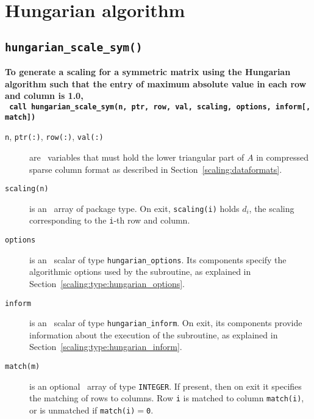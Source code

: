 
\section{Hungarian algorithm}

\subsection{\texttt{hungarian\_scale\_sym()}}

\textbf{\noindent
   To generate a scaling for a symmetric matrix using the Hungarian algorithm such that the entry of maximum absolute value in each row and column is 1.0,
   \vspace*{0.3cm} \\
   \texttt{ \hspace*{0.2cm}
      call hungarian\_scale\_sym(n, ptr, row, val, scaling, options, inform[, match])
   }
   \vspace{0.3cm}
}

\begin{description}

\item[\texttt{n}, \texttt{ptr(:)}, \texttt{row(:)}, \texttt{val(:)}] are \intentin\ variables that must hold the lower triangular part of $A$ in compressed sparse column format as described in Section~\ref{scaling:dataformats}.

\item[\texttt{scaling(n)}] is an \intentout\ array of package type. On exit,
\texttt{scaling(i)} holds $d_i$, the scaling corresponding to the
\texttt{i}-th row and column.

\item[\texttt{options}] is an \intentin\ scalar of type \texttt{hungarian\_options}. Its components specify the algorithmic options used by the subroutine, as explained in Section~\ref{scaling:type:hungarian_options}.

\item[\texttt{inform}] is an \intentout\ scalar of type \texttt{hungarian\_inform}. On exit, its components provide information about the execution of the subroutine, as explained in Section~\ref{scaling:type:hungarian_inform}.

\item[\texttt{match(m)}] is an optional \intentout\ array of type {\tt INTEGER}.
If present, then on exit it specifies the matching of rows to
columns. Row \texttt{i} is matched to column \texttt{match(i)}, or is unmatched
if \texttt{match(i)}$=$\texttt{0}.

\end{description}

